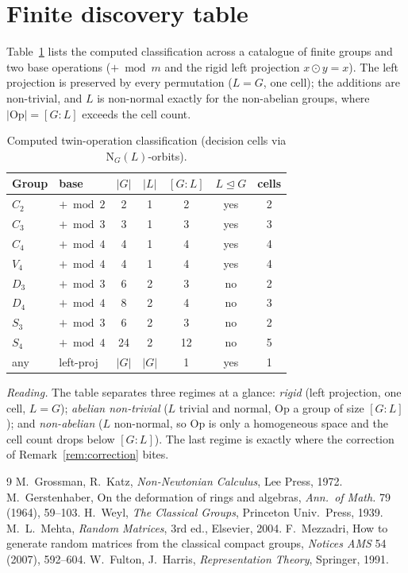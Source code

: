 \documentclass[11pt,a4paper]{article}
\newcommand{\Op}{\mathrm{Op}}
\newcommand{\Norm}{\mathrm{N}}
\theoremstyle{plain}
\theoremstyle{definition}
\theoremstyle{remark}
\begin{document}
\section{Finite discovery table}
\label{app:disc}

Table~\ref{tab:disc-full} lists the computed classification across a catalogue of
finite groups and two base operations ($+\bmod m$ and the rigid left projection
$x\odot y=x$). The left projection is preserved by every permutation ($L=G$,
one cell); the additions are non-trivial, and $L$ is non-normal exactly for the
non-abelian groups, where $|\Op|=[G:L]$ exceeds the cell count.

\begin{table}[ht]
\centering
\caption{Computed twin-operation classification (decision cells via
$\Norm_G(L)$-orbits).}
\label{tab:disc-full}
\begin{tabular}{llccccc}
\toprule
Group & base & $|G|$ & $|L|$ & $[G:L]$ & $L\trianglelefteq G$ & cells \\
\midrule
$C_2$ & $+\bmod 2$ & 2 & 1 & 2 & yes & 2 \\
$C_3$ & $+\bmod 3$ & 3 & 1 & 3 & yes & 3 \\
$C_4$ & $+\bmod 4$ & 4 & 1 & 4 & yes & 4 \\
$V_4$ & $+\bmod 4$ & 4 & 1 & 4 & yes & 4 \\
$D_3$ & $+\bmod 3$ & 6 & 2 & 3 & no  & 2 \\
$D_4$ & $+\bmod 4$ & 8 & 2 & 4 & no  & 3 \\
$S_3$ & $+\bmod 3$ & 6 & 2 & 3 & no  & 2 \\
$S_4$ & $+\bmod 4$ & 24 & 2 & 12 & no & 5 \\
\midrule
any  & left-proj  & $|G|$ & $|G|$ & 1 & yes & 1 \\
\bottomrule
\end{tabular}
\end{table}

\noindent\emph{Reading.} The table separates three regimes at a glance:
\emph{rigid} (left projection, one cell, $L=G$); \emph{abelian non-trivial}
($L$ trivial and normal, $\Op$ a group of size $[G:L]$); and \emph{non-abelian}
($L$ non-normal, so $\Op$ is only a homogeneous space and the cell count drops
below $[G:L]$). The last regime is exactly where the correction of
Remark~\ref{rem:correction} bites.

\begin{thebibliography}{9}
 M.~Grossman, R.~Katz, \emph{Non-Newtonian Calculus},
Lee Press, 1972.
 M.~Gerstenhaber, On the deformation of rings and
algebras, \emph{Ann.\ of Math.} 79 (1964), 59--103.
 H.~Weyl, \emph{The Classical Groups}, Princeton Univ.\ Press, 1939.
 M.~L.~Mehta, \emph{Random Matrices}, 3rd ed., Elsevier, 2004.
 F.~Mezzadri, How to generate random matrices from the
classical compact groups, \emph{Notices AMS} 54 (2007), 592--604.
 W.~Fulton, J.~Harris, \emph{Representation Theory}, Springer, 1991.
\end{thebibliography}
\end{document}
